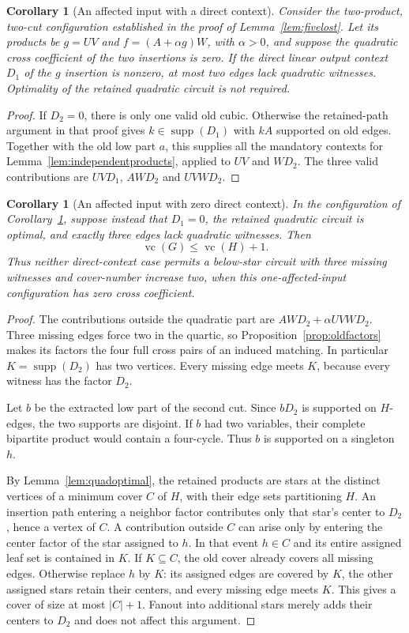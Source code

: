 \documentclass[11pt]{article}
\newcommand{\supp}{\operatorname{supp}}
\newcommand{\vc}{\operatorname{vc}}
\newtheorem{corollary}[theorem]{Corollary}
\theoremstyle{definition}
\theoremstyle{remark}
\begin{document}
\begin{corollary}[An affected input with a direct context]\label{cor:affectedcase}
Consider the two-product, two-cut configuration established in the proof of Lemma~\ref{lem:fivelost}. Let its products be $g=UV$ and $f=(A+\alpha g)W$, with $\alpha>0$, and suppose the quadratic cross coefficient of the two insertions is zero. If the direct linear output context $D_1$ of the $g$ insertion is nonzero, at most two edges lack quadratic witnesses. Optimality of the retained quadratic circuit is not required.
\end{corollary}
\begin{proof}
If $D_2=0$, there is only one valid old cubic. Otherwise the retained-path argument in that proof gives $k\in\supp(D_1)$ with $kA$ supported on old edges. Together with the old low part $a$, this supplies all the mandatory contexts for Lemma~\ref{lem:independentproducts}, applied to $UV$ and $WD_2$. The three valid contributions are $UVD_1$, $AWD_2$ and $UVWD_2$.
\end{proof}

\begin{corollary}[An affected input with zero direct context]\label{cor:zeroaffected}
In the configuration of Corollary~\ref{cor:affectedcase}, suppose instead that $D_1=0$, the retained quadratic circuit is optimal, and exactly three edges lack quadratic witnesses. Then
\[
 \vc(G)\le\vc(H)+1.
\]
Thus neither direct-context case permits a below-star circuit with three missing witnesses and cover-number increase two, when this one-affected-input configuration has zero cross coefficient.
\end{corollary}
\begin{proof}
The contributions outside the quadratic part are $AWD_2+\alpha UVWD_2$. Three missing edges force two in the quartic, so Proposition~\ref{prop:oldfactors} makes its factors the four full cross pairs of an induced matching. In particular $K=\supp(D_2)$ has two vertices. Every missing edge meets $K$, because every witness has the factor $D_2$.

Let $b$ be the extracted low part of the second cut. Since $bD_2$ is supported on $H$-edges, the two supports are disjoint. If $b$ had two variables, their complete bipartite product would contain a four-cycle. Thus $b$ is supported on a singleton $h$.

By Lemma~\ref{lem:quadoptimal}, the retained products are stars at the distinct vertices of a minimum cover $C$ of $H$, with their edge sets partitioning $H$. An insertion path entering a neighbor factor contributes only that star's center to $D_2$, hence a vertex of $C$. A contribution outside $C$ can arise only by entering the center factor of the star assigned to $h$. In that event $h\in C$ and its entire assigned leaf set is contained in $K$. If $K\subseteq C$, the old cover already covers all missing edges. Otherwise replace $h$ by $K$: its assigned edges are covered by $K$, the other assigned stars retain their centers, and every missing edge meets $K$. This gives a cover of size at most $|C|+1$. Fanout into additional stars merely adds their centers to $D_2$ and does not affect this argument.
\end{proof}
\end{document}
